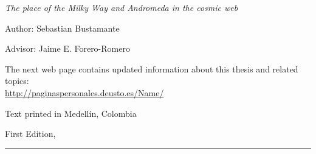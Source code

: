 
\thispagestyle{empty}

\hfill

\vfill

\medskip


\noindent
\textit{
The place of the Milky Way and Andromeda in the cosmic web
}




Author: Sebastian Bustamante

Advisor: Jaime E. Forero-Romero



\vfill

\vfill

\noindent
The next web page contains updated information about this thesis and related topics: \\
\url{http://paginaspersonales.deusto.es/Name/}


\noindent
Text printed in Medellín, Colombia

\noindent
First Edition, 
\monthname \ \the\year

\vspace{1cm}
\hrule
\bigskip

\cleardoublepage

%
%
%
%
%
%

